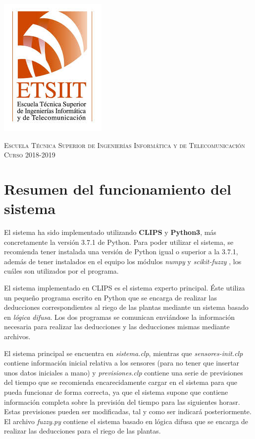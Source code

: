 \documentclass[11pt,a4paper]{article}
\begin{document}
\begin{titlepage}
\begin{minipage}{\textwidth}
\includegraphics[scale=0.3]{img/etsiit.jpeg}

\vspace{0.5cm}
\textsc{Escuela Técnica Superior de Ingenierías Informática y de Telecomunicación}\\
\vspace{0.5cm}
\textsc{Curso 2018-2019}
\end{minipage}
\end{titlepage}

\tableofcontents
\thispagestyle{empty}				%

\newpage

\setlength{\parskip}{1em}

\section{Resumen del funcionamiento del sistema}

El sistema ha sido implementado utilizando \textbf{CLIPS} y \textbf{Python3}, más concretamente la versión 3.7.1 de Python.
Para poder utilizar el sistema, se recomienda tener instalada una versión de Python igual o superior a la 3.7.1,
además de tener instalados en el equipo los módulos \textit{numpy} \cite{bib:numpy} y \textit{scikit-fuzzy}
\cite{bib:skfuzzy}, los cuáles son utilizados por el programa.

El sistema implementado en CLIPS es el sistema experto principal. Éste utiliza un pequeño programa escrito en Python que se encarga
de realizar las deducciones correspondientes al riego de las plantas mediante un sistema basado en \textit{lógica difusa}.
Los dos programas se comunican enviándose la información necesaria para realizar las deducciones y las deducciones mismas mediante
archivos.

El sistema principal se encuentra en \textit{sistema.clp}, mientras que \textit{sensores-init.clp} contiene información inicial
relativa a los sensores (para no tener que insertar unos datos iniciales a mano) y \textit{previsiones.clp} contiene una serie
de previsiones del tiempo que se recomienda encarecidamente cargar en el sistema para que pueda funcionar de forma correcta,
ya que el sistema supone que contiene información completa sobre la previsión del tiempo para las siguientes horasr.
Estas previsiones pueden ser modificadas, tal y como ser indicará posteriormente. El archivo \textit{fuzzy.py} contiene
el sistema basado en lógica difusa que se encarga de realizar las deducciones para el riego de las plantas.
\end{document}
